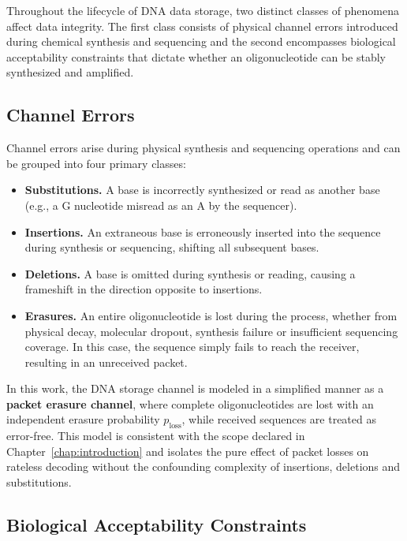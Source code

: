 Throughout the lifecycle of DNA data storage, two distinct classes of phenomena affect data integrity. The first class consists of physical channel errors introduced during chemical synthesis and sequencing and the second encompasses biological acceptability constraints that dictate whether an oligonucleotide can be stably synthesized and amplified.

\subsection{Channel Errors}

Channel errors arise during physical synthesis and sequencing operations and can be grouped into four primary classes:

\begin{itemize}
    \item \textbf{Substitutions.} A base is incorrectly synthesized or read as another base (e.g., a G nucleotide misread as an A by the sequencer).
    
    \item \textbf{Insertions.} An extraneous base is erroneously inserted into the sequence during synthesis or sequencing, shifting all subsequent bases.
    
    \item \textbf{Deletions.} A base is omitted during synthesis or reading, causing a frameshift in the direction opposite to insertions.
    
    \item \textbf{Erasures.} An entire oligonucleotide is lost during the process, whether from physical decay, molecular dropout, synthesis failure or insufficient sequencing coverage. In this case, the sequence simply fails to reach the receiver, resulting in an unreceived packet.
\end{itemize}

In this work, the DNA storage channel is modeled in a simplified manner as a \textbf{packet erasure channel}, where complete oligonucleotides are lost with an independent erasure probability $p_{\text{loss}}$, while received sequences are treated as error-free. This model is consistent with the scope declared in Chapter~\ref{chap:introduction} and isolates the pure effect of packet losses on rateless decoding without the confounding complexity of insertions, deletions and substitutions.

\subsection{Biological Acceptability Constraints}


